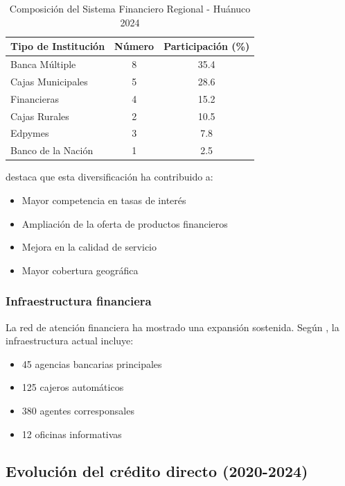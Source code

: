\documentclass[12pt, a4paper]{article}
\begin{document}
\begin{table}[ht]
\centering
\caption{Composición del Sistema Financiero Regional - Huánuco 2024}
\begin{tabular}{|l|c|c|}
\hline
\textbf{Tipo de Institución} & \textbf{Número} & \textbf{Participación (\%)} \\
\hline
Banca Múltiple & 8 & 35.4 \\
Cajas Municipales & 5 & 28.6 \\
Financieras & 4 & 15.2 \\
Cajas Rurales & 2 & 10.5 \\
Edpymes & 3 & 7.8 \\
Banco de la Nación & 1 & 2.5 \\
\hline
\end{tabular}
\end{table}

\textcite{Lopez2024} destaca que esta diversificación ha contribuido a:
\begin{itemize}
    \item Mayor competencia en tasas de interés
    \item Ampliación de la oferta de productos financieros
    \item Mejora en la calidad de servicio
    \item Mayor cobertura geográfica
\end{itemize}

\subsubsection{Infraestructura financiera}

La red de atención financiera ha mostrado una expansión sostenida. Según \textcite{Mendoza2023}, la infraestructura actual incluye:

\begin{itemize}
    \item 45 agencias bancarias principales
    \item 125 cajeros automáticos
    \item 380 agentes corresponsales
    \item 12 oficinas informativas
\end{itemize}

\subsection{Evolución del crédito directo (2020-2024)}
\end{document}
